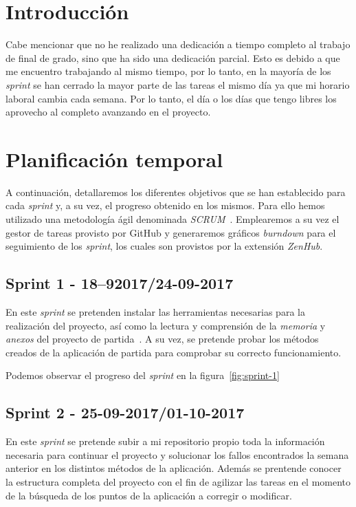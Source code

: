 
\section{Introducción}
Cabe mencionar que no he realizado una dedicación a tiempo completo al trabajo de final de grado, sino que ha sido una dedicación parcial. Esto es debido a que me encuentro trabajando al mismo tiempo, por lo tanto, en la mayoría de los \textit{sprint} se han cerrado la mayor parte de las tareas el mismo día ya que mi horario laboral cambia cada semana. Por lo tanto, el día o los días que tengo libres los aprovecho al completo avanzando en el proyecto.

\section{Planificación temporal}
A continuación, detallaremos los diferentes objetivos que se han establecido para cada \textit{sprint} y, a su vez, el progreso obtenido en los mismos. Para ello hemos utilizado una metodología ágil denominada \textit{SCRUM}~\cite{schwaber2002agile}. Emplearemos a su vez el gestor de tareas provisto por GitHub y generaremos gráficos \textit{burndown} para el seguimiento de los \textit{sprint}, los cuales son provistos por la extensión \textit{ZenHub}.

\subsection{Sprint 1 - 18--92017/24-09-2017}
En este \textit{sprint} se pretenden instalar las herramientas necesarias para la realización del proyecto, así como la lectura y comprensión de la \textit{memoria} y \textit{anexos} del proyecto de partida~\cite{github:alberto-viewer}. A su vez, se pretende probar los métodos creados de la aplicación de partida para comprobar su correcto funcionamiento.

Podemos observar el progreso del \textit{sprint} en la figura~\ref{fig:sprint-1}

\subsection{Sprint 2 - 25-09-2017/01-10-2017}
En este \textit{sprint} se pretende subir a mi repositorio propio toda la información necesaria para continuar el proyecto y solucionar los fallos encontrados la semana anterior en los distintos métodos de la aplicación. Además se prentende conocer la estructura completa del proyecto con el fin de agilizar las tareas en el momento de la búsqueda de los puntos de la aplicación a corregir o modificar.

